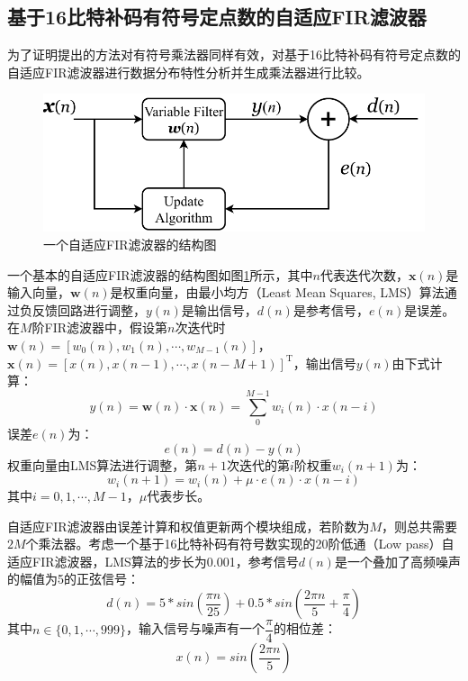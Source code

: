 \subsection{基于16比特补码有符号定点数的自适应FIR滤波器}

为了证明提出的方法对有符号乘法器同样有效，对基于16比特补码有符号定点数的自适应FIR滤波器进行数据分布特性分析并生成乘法器进行比较。
\begin{figure}[!ht]
    \centering
    \includegraphics[width=0.7\linewidth]{./figs/AC-AM-Adapt-FIR-structure.pdf}
    \caption{一个自适应FIR滤波器的结构图}
    \label{AC:AM:Adapt:FIR:Fig:structure}
\end{figure}
一个基本的自适应FIR滤波器的结构图如图\ref{AC:AM:Adapt:FIR:Fig:structure}所示，其中$n$代表迭代次数，$\boldsymbol{x}(n)$是输入向量，$\boldsymbol{w}(n)$是权重向量，由最小均方（Least Mean Squares, LMS）算法通过负反馈回路进行调整，$y(n)$是输出信号，$d(n)$是参考信号，$e(n)$是误差。
在$M$阶FIR滤波器中，假设第$n$次迭代时$\boldsymbol{w}(n) = [w_0(n), w_1(n), \cdots , w_{M-1}(n)]$，$\boldsymbol{x}(n) = [x(n), x(n-1), \cdots , x(n-M+1)]^\mathrm{T}$，输出信号$y(n)$由下式计算：
\begin{equation}
    \label{AC:AM:Adapt:FIR:Eq:yn}
    y(n) = \boldsymbol{w}(n) \cdot \boldsymbol{x}(n) = \sum_{0}^{M-1} w_i(n) \cdot x(n-i)
\end{equation}
误差$e(n)$为：
\begin{equation}
    \label{AC:AM:Adapt:FIR:Eq:en}
    e(n) = d(n) - y(n)
\end{equation}
权重向量由LMS算法进行调整，第$n+1$次迭代的第$i$阶权重$w_i (n+1)$为：
\begin{equation}
    \label{AC:AM:Adapt:FIR:Eq:LMS}
    w_i(n+1) = w_i(n) + \mu \cdot e(n) \cdot x(n-i)
\end{equation}
其中$i=0, 1, \cdots , M-1$，$\mu$代表步长。

自适应FIR滤波器由误差计算和权值更新两个模块组成，若阶数为$M$，则总共需要$2M$个乘法器。考虑一个基于16比特补码有符号数实现的20阶低通（Low pass）自适应FIR滤波器，LMS算法的步长为0.001，参考信号$d(n)$是一个叠加了高频噪声的幅值为5的正弦信号：
\begin{equation}
    \label{AC:AM:Adapt:FIR:Eq:dn}
    d(n) = 5 * sin ( \frac{\pi n}{25} ) + 0.5 * sin ( \frac{2 \pi n}{5}  + \frac{\pi}{4} )
\end{equation}
其中$n \in \{0, 1, \cdots, 999\}$，输入信号与噪声有一个$\dfrac{\pi}{4}$的相位差：
\begin{equation}
    \label{AC:AM:Adapt:FIR:Eq:xn}
    x(n) = sin ( \frac{2 \pi n}{5} )
\end{equation}


